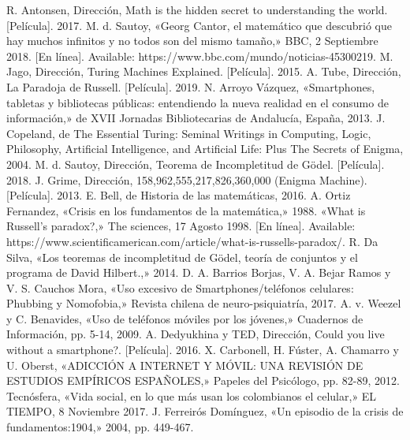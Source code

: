 \documentclass[letterpaper, 12 pt, conference]{ieeeconf}  %
\begin{document}
\begin{thebibliography}{99}

 R. Antonsen, Dirección, Math is the hidden secret to understanding the world. [Película]. 2017. 
 M. d. Sautoy, «Georg Cantor, el matemático que descubrió que hay muchos infinitos y no todos son del mismo tamaño,» BBC, 2 Septiembre 2018. [En línea]. Available: https://www.bbc.com/mundo/noticias-45300219.
 M. Jago, Dirección, Turing Machines Explained. [Película]. 2015.
 A. Tube, Dirección, La Paradoja de Russell. [Película]. 2019.
 N. Arroyo Vázquez, «Smartphones, tabletas y bibliotecas públicas: entendiendo la nueva realidad en el consumo de información,» de XVII Jornadas Bibliotecarias de Andalucía, España, 2013.
 J. Copeland, de The Essential Turing: Seminal Writings in Computing, Logic, Philosophy, Artificial Intelligence, and Artificial Life: Plus The Secrets of Enigma, 2004.
 M. d. Sautoy, Dirección, Teorema de Incompletitud de Gödel. [Película]. 2018.
 J. Grime, Dirección, 158,962,555,217,826,360,000 (Enigma Machine). [Película]. 2013.
 E. Bell, de Historia de las matemáticas, 2016.
 A. Ortiz Fernandez, «Crisis en los fundamentos de la matemática,» 1988.
 «What is Russell's paradox?,» The sciences, 17 Agosto 1998. [En línea]. Available: https://www.scientificamerican.com/article/what-is-russells-paradox/.
 R. Da Silva, «Los teoremas de incompletitud de Gödel, teoría de conjuntos y el programa de David Hilbert.,» 2014. 
 D. A. Barrios Borjas, V. A. Bejar Ramos y V. S. Cauchos Mora, «Uso excesivo de Smartphones/teléfonos celulares: Phubbing y Nomofobia,» Revista chilena de neuro-psiquiatría, 2017. 
 A. v. Weezel y C. Benavides, «Uso de teléfonos móviles por los jóvenes,» Cuadernos de Información, pp. 5-14, 2009. 
 A. Dedyukhina y TED, Dirección, Could you live without a smartphone?. [Película]. 2016.
 X. Carbonell, H. Fúster, A. Chamarro y U. Oberst, «ADICCIÓN A INTERNET Y MÓVIL: UNA REVISIÓN DE ESTUDIOS EMPÍRICOS ESPAÑOLES,» Papeles del Psicólogo, pp. 82-89, 2012.
 Tecnósfera, «Vida social, en lo que más usan los colombianos el celular,» EL TIEMPO, 8 Noviembre 2017.
 J. Ferreirós Domínguez, «Un episodio de la crisis de fundamentos:1904,» 2004, pp. 449-467.

\end{thebibliography}
\end{document}

